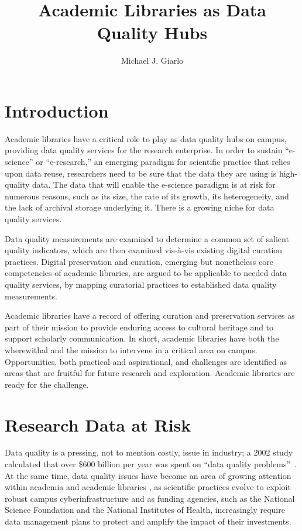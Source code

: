\documentclass[man,12pt,biblatex]{apa6}
\title{Academic Libraries as Data Quality Hubs}
\author{Michael J. Giarlo}
\affiliation{Penn State University}
\begin{document}
\maketitle
\section{Introduction}
Academic libraries have a critical role to play as data quality hubs
on campus, providing data quality services for the research
enterprise. In order to sustain ``e-science'' or ``e-research,'' an
emerging paradigm for scientific practice that relies upon data reuse,
researchers need to be sure that the data they are using is
high-quality data. The data that will enable the e-science paradigm is
at risk for numerous reasons, such as its size, the rate of its
growth, its heterogeneity, and the lack of archival storage underlying
it. There is a growing niche for data quality services.

Data quality measurements are examined to determine a common set of
salient quality indicators, which are then examined vis-\`{a}-vis
existing digital curation practices. Digital preservation and
curation, emerging but nonetheless core competencies of academic
libraries, are argued to be applicable to needed data quality
services, by mapping curatorial practices to established data quality
measurements.

Academic libraries have a record of offering curation and preservation
services as part of their mission to provide enduring access to
cultural heritage and to support scholarly communication.  In short,
academic libraries have both the wherewithal and the mission to
intervene in a critical area on campus. Opportunities, both practical
and aspirational, and challenges are identified as areas that are
fruitful for future research and exploration. Academic libraries are
ready for the challenge.

\section{Research Data at Risk}
Data quality is a pressing, not to mention costly, issue in industry;
a 2002 study \parencite{russom:case} calculated that over \$600 billion per
year was spent on ``data quality problems''\ 
\parencite{eckerson:bottomline}.  At the same time, data quality issues
have become an area of growing attention within academia and academic
libraries \parencite{heidorn:libraries,arl:stewardship,ogburn:imperative,jisc:deluge},
as scientific practices evolve to exploit robust campus
cyberinfrastructure and as funding agencies, such as the National
Science Foundation and the National Institutes of Health, increasingly
require data management plans to protect and amplify the impact of
their investments.
\end{document}
